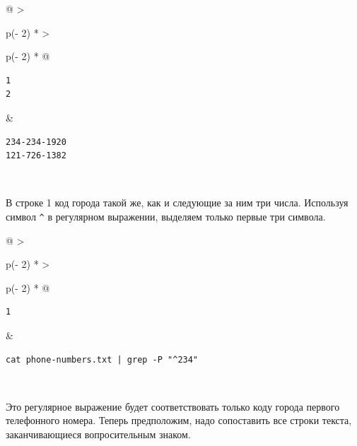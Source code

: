 \documentclass{article}
\begin{document}
\begin{longtable}[]{@{}
  >{\raggedright\arraybackslash}p{(\columnwidth - 2\tabcolsep) * }
  >{\raggedright\arraybackslash}p{(\columnwidth - 2\tabcolsep) * }@{}}
\toprule
\endhead
\begin{minipage}[t]{\linewidth}\raggedright
\begin{verbatim}
1
2
\end{verbatim}
\end{minipage} & \begin{minipage}[t]{\linewidth}\raggedright
\begin{verbatim}
234-234-1920
121-726-1382
\end{verbatim}
\end{minipage} \\ \addlinespace
\bottomrule
\end{longtable}

В строке 1 код города такой же, как и следующие за ним три числа.
Используя символ \texttt{\^{}} в регулярном выражении, выделяем только
первые три символа.

\begin{longtable}[]{@{}
  >{\raggedright\arraybackslash}p{(\columnwidth - 2\tabcolsep) * }
  >{\raggedright\arraybackslash}p{(\columnwidth - 2\tabcolsep) * }@{}}
\toprule
\endhead
\begin{minipage}[t]{\linewidth}\raggedright
\begin{verbatim}
1
\end{verbatim}
\end{minipage} & \begin{minipage}[t]{\linewidth}\raggedright
\begin{verbatim}
cat phone-numbers.txt | grep -P "^234"
\end{verbatim}
\end{minipage} \\ \addlinespace
\bottomrule
\end{longtable}

Это регулярное выражение будет соответствовать только коду города
первого телефонного номера. Теперь предположим, надо сопоставить все
строки текста, заканчивающиеся вопросительным знаком.
\end{document}
